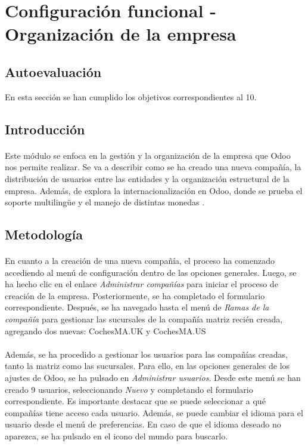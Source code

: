 \section{Configuración funcional - Organización de la empresa}
\subsection{Autoevaluación}
En esta sección se han cumplido los objetivos correspondientes al 10.
\subsection{Introducción}
\paragraph{}
Este módulo se enfoca en la gestión y la organización de la empresa que Odoo nos permite realizar. Se va a describir como se ha creado una nueva compañía, la distribución de usuarios entre las entidades y la organización estructural de la empresa. Además, de explora la internacionalización en Odoo, donde se prueba el soporte multilingüe y el manejo de distintas monedas .
\subsection{Metodología}
\paragraph{}
En cuanto a la creación de una nueva compañía, el proceso ha comenzado accediendo al menú de configuración dentro de las opciones generales. Luego, se ha hecho clic en el enlace \textit{Administrar compañías} para iniciar el proceso de creación de la empresa. Posteriormente, se ha completado el formulario correspondiente. Después, se ha navegado hasta el menú de \textit{Ramas de la compañía} para gestionar las sucursales de la compañía matriz recién creada, agregando dos nuevas: CochesMA.UK y CochesMA.US
\paragraph{}
Además, se ha procedido a gestionar los usuarios para las compañías creadas, tanto la matriz como las sucursales. Para ello, en las opciones generales de los ajustes de Odoo, se ha pulsado en \textit{Administrar usuarios}. Desde este menú se han creado 9 usuarios, seleccionando \textit{Nuevo} y completando el formulario correspondiente. Es importante destacar que se puede seleccionar a qué compañías tiene acceso cada usuario. Además, se puede cambiar el idioma para el usuario desde el menú de preferencias. En caso de que el idioma deseado no aparezca, se ha pulsado en el icono del mundo para buscarlo.
